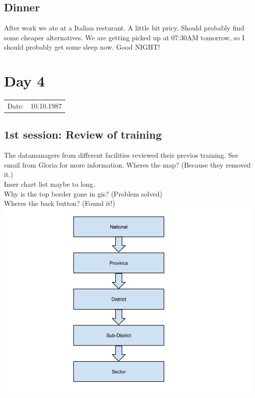 \subsection{Dinner}
After work we ate at a Italian resturant. A little bit pricy. Should probably find some cheaper alternatives.
We are getting picked up at 07:30AM tomorrow, so I should probably get some sleep now. Good NIGHT!
\section{Day 4}
\begin{tabular}{|c|c|}
Date: & 10.10.1987 \\
\end{tabular}
\subsection{1st session: Review of training}
The datamanagers from different facilities reviewed their previos training. See email from Gloria for more information.
Wheres the map? (Because they removed it.)\\
Inser chart list maybe to long.\\
Why is the top border gone in gis? (Problem solved)\\
Wheres the back button? (Found it!)\\
\includegraphics[width=15cm]{appendix/images/dhis2_map_categories}

